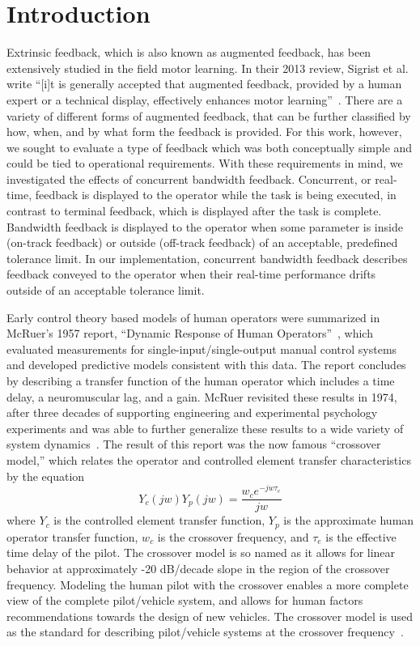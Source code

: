 
\section{Introduction}
Extrinsic feedback, which is also known as augmented feedback, has been extensively studied in the field motor learning.
In their 2013 review, Sigrist et al. write ``[i]t is generally accepted that augmented feedback, provided by a human expert or a technical display, effectively enhances motor learning''~\cite{sigrist_augmented_2013}.
There are a variety of different forms of augmented feedback, that can be further classified by how, when, and by what form the feedback is provided.
For this work, however, we sought to evaluate a type of feedback which was both conceptually simple and could be tied to operational requirements.
With these requirements in mind, we investigated the effects of concurrent bandwidth feedback.
Concurrent, or real-time, feedback is displayed to the operator while the task is being executed, in contrast to terminal feedback, which is displayed after the task is complete.
Bandwidth feedback is displayed to the operator when some parameter is inside (on-track feedback) or outside (off-track feedback) of an acceptable, predefined tolerance limit.
In our implementation, concurrent bandwidth feedback describes feedback conveyed to the operator when their real-time performance drifts outside of an acceptable tolerance limit.

Early control theory based models of human operators were summarized in McRuer's 1957 report, ``Dynamic Response of Human Operators''~\cite{mcruer_dynamic_1957}, which evaluated measurements for single-input/single-output manual control systems and developed predictive models consistent with this data.
The report concludes by describing a transfer function of the human operator which includes a time delay, a neuromuscular lag, and a gain.
McRuer revisited these results in 1974, after three decades of supporting engineering and experimental psychology experiments and was able to further generalize these results to a wide variety of system dynamics~\cite{mcruer_mathematical_1974}.
The result of this report was the now famous ``crossover model,'' which relates the operator and controlled element transfer characteristics by the equation
\begin{equation}
Y_c(jw) Y_p(jw) = \dfrac{w_c e^{-jw \tau_e}}{jw}
\end{equation}
where $Y_c$ is the controlled element transfer function, $Y_p$ is the approximate human operator transfer function, $w_c$ is the crossover frequency, and $\tau_e$ is the effective time delay of the pilot.
The crossover model is so named as it allows for linear behavior at approximately -20 dB/decade slope in the region of the crossover frequency.
Modeling the human pilot with the crossover enables a more complete view of the complete pilot/vehicle system, and allows for human factors recommendations towards the design of new vehicles.
The crossover model is used as the standard for describing pilot/vehicle systems at the crossover frequency~\cite{mcruer_mathematical_1974,mcruer_human_1965,xu_review_2017}.

